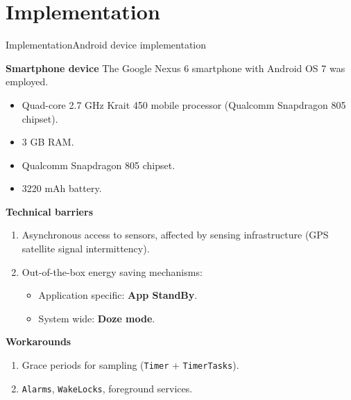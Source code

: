 \section{Implementation}
\begin{frame}{Implementation}{Android device implementation}
\small

\begin{block}{\small \textbf{Smartphone device}}
The Google Nexus 6 smartphone with Android OS 7 was employed.
\begin{itemize}
  \item Quad-core 2.7 GHz Krait 450 mobile processor (Qualcomm Snapdragon 805 chipset).
  \item 3 GB RAM.
  \item Qualcomm Snapdragon 805 chipset.
  \item 3220 mAh battery.
\end{itemize}
\end{block}

\begin{alertblock}{\small \textbf{Technical barriers}}
\begin{enumerate}
  \item Asynchronous access to sensors, affected by sensing infrastructure (GPS satellite signal intermittency).
  \item Out-of-the-box energy saving mechanisms:
  \begin{itemize}
    \item Application specific: \textbf{App StandBy}.
    \item System wide: \textbf{Doze mode}.
  \end{itemize}
\end{enumerate}
\end{alertblock}

\begin{exampleblock}{\small \textbf{Workarounds}}
\begin{enumerate}
  \item Grace periods for sampling (\texttt{Timer} + \texttt{TimerTasks}).
  \item \texttt{Alarms}, \texttt{WakeLocks}, foreground services.
\end{enumerate}
\end{exampleblock}
\end{frame}
